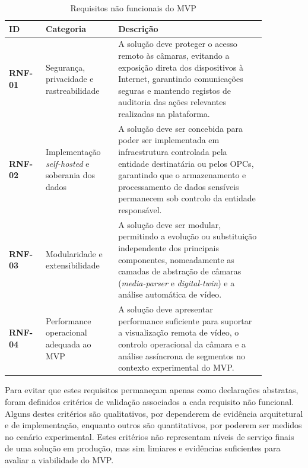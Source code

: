 \begin{table}[H]
    \centering
    \caption{Requisitos não funcionais do \gls{MVP}}
    \label{tab:requisitos_nao_funcionais}
    \begin{tabular}{p{0.12\linewidth} p{0.24\linewidth} p{0.50\linewidth}}
        \toprule
        \textbf{ID} & \textbf{Categoria} & \textbf{Descrição} \\
        \midrule
        \textbf{RNF-01} & Segurança, privacidade e rastreabilidade & A solução deve proteger o acesso remoto às câmaras, evitando a exposição direta dos dispositivos à Internet, garantindo comunicações seguras e mantendo registos de auditoria das ações relevantes realizadas na plataforma. \\
        \textbf{RNF-02} & Implementação \textit{self-hosted} e soberania dos dados & A solução deve ser concebida para poder ser implementada em infraestrutura controlada pela entidade destinatária ou pelos \glspl{OPC}, garantindo que o armazenamento e processamento de dados sensíveis permanecem sob controlo da entidade responsável. \\
        \textbf{RNF-03} & Modularidade e extensibilidade & A solução deve ser modular, permitindo a evolução ou substituição independente dos principais componentes, nomeadamente as camadas de abstração de câmaras (\textit{media-parser} e \textit{digital-twin}) e a análise automática de vídeo. \\
        \textbf{RNF-04} & Performance operacional adequada ao \gls{MVP} & A solução deve apresentar performance suficiente para suportar a visualização remota de vídeo, o controlo operacional da câmara e a análise assíncrona de segmentos no contexto experimental do \gls{MVP}. \\
        \bottomrule
    \end{tabular}
\end{table}

Para evitar que estes requisitos permaneçam apenas como declarações abstratas, foram definidos critérios de validação associados a cada requisito não funcional. Alguns destes critérios são qualitativos, por dependerem de evidência arquitetural e de implementação, enquanto outros são quantitativos, por poderem ser medidos no cenário experimental. Estes critérios não representam níveis de serviço finais de uma solução em produção, mas sim limiares e evidências suficientes para avaliar a viabilidade do \gls{MVP}.

